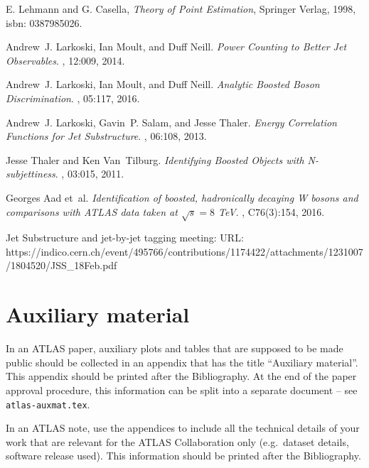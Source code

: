 \documentclass[UKenglish,texlive=2013]{\ATLASLATEXPATH atlasdoc}
\begin{document}
\begin{thebibliography}{9}
E. Lehmann and G. Casella,
\emph{Theory of Point Estimation},
Springer Verlag, 1998,
isbn: 0387985026.


Andrew~J. Larkoski, Ian Moult, and Duff Neill.
\emph {Power Counting to Better Jet Observables}.
, 12:009, 2014.

Andrew~J. Larkoski, Ian Moult, and Duff Neill.
\emph {Analytic Boosted Boson Discrimination}.
, 05:117, 2016.

Andrew~J. Larkoski, Gavin~P. Salam, and Jesse Thaler.
\emph {Energy Correlation Functions for Jet Substructure}.
, 06:108, 2013.

Jesse Thaler and Ken Van~Tilburg.
\emph {Identifying Boosted Objects with N-subjettiness}.
, 03:015, 2011.


Georges Aad et~al.
\emph {Identification of boosted, hadronically decaying W bosons and
  comparisons with ATLAS data taken at $\sqrt{s} = 8$ TeV}.
, C76(3):154, 2016.

Jet Substructure and jet-by-jet tagging meeting:
URL: https://indico.cern.ch/event/495766/contributions/1174422/attachments/1231007/1804520/JSS\_18Feb.pdf

\end{thebibliography}
\printbibliography
%
%

\clearpage
{}

\clearpage
\appendix
\part*{Auxiliary material}

In an ATLAS paper, auxiliary plots and tables that are supposed to be made public 
should be collected in an appendix that has the title \enquote{Auxiliary material}.
This appendix should be printed after the Bibliography.
At the end of the paper approval procedure, this information can be split into a separate document
-- see \texttt{atlas-auxmat.tex}.

In an ATLAS note, use the appendices to include all the technical details of your work
that are relevant for the ATLAS Collaboration only (e.g.\ dataset details, software release used).
This information should be printed after the Bibliography.
\end{document}
